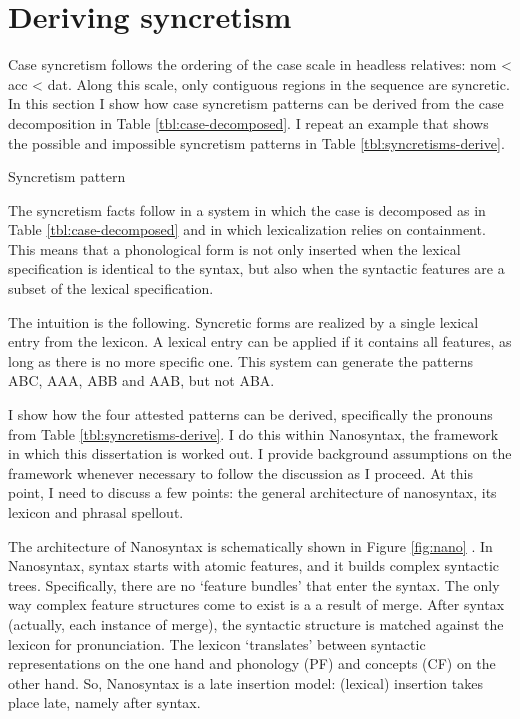 \section{Deriving syncretism}\label{sec:syncretism}

Case syncretism follows the ordering of the case scale in headless relatives: \ac{nom} < \ac{acc} < \ac{dat}. Along this scale, only contiguous regions in the sequence are syncretic. In this section I show how case syncretism patterns can be derived from the case decomposition in Table \ref{tbl:case-decomposed}. I repeat an example that shows the possible and impossible syncretism patterns in Table \ref{tbl:syncretisms-derive}.

\begin{table}[ht]
  \center
  \caption {Syncretism pattern}
    
  \label{tbl:syncretisms-derive}
\end{table}

The syncretism facts follow in a system in which the case is decomposed as in Table \ref{tbl:case-decomposed} and in which lexicalization relies on containment. This means that a phonological form is not only inserted when the lexical specification is identical to the syntax, but also when the syntactic features are a subset of the lexical specification.

The intuition is the following. Syncretic forms are realized by a single lexical entry from the lexicon. A lexical entry can be applied if it contains all features, as long as there is no more specific one. This system can generate the patterns ABC, AAA, ABB and AAB, but not ABA.

I show how the four attested patterns can be derived, specifically the pronouns from Table \ref{tbl:syncretisms-derive}. I do this within Nanosyntax, the framework in which this dissertation is worked out. I provide background assumptions on the framework whenever necessary to follow the discussion as I proceed. At this point, I need to discuss a few points: the general architecture of nanosyntax, its lexicon and phrasal spellout.

The architecture of Nanosyntax is schematically shown in Figure \ref{fig:nano} \citep[from][]{vandenwyngaerd2020,caha2019}. In Nanosyntax, syntax starts with atomic features, and it builds complex syntactic trees. Specifically, there are no `feature bundles' that enter the syntax. The only way complex feature structures come to exist is a a result of merge.
After syntax (actually, each instance of merge), the syntactic structure is matched against the lexicon for pronunciation. The lexicon `translates' between syntactic representations on the one hand and phonology (PF) and concepts (CF) on the other hand. So, Nanosyntax is a late insertion model: (lexical) insertion takes place late, namely after syntax.

